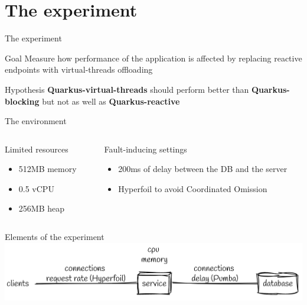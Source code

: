 \documentclass{beamer}
\begin{document}
\section{The experiment}
\begin{frame}{The experiment}
    \begin{block}{Goal}
        Measure how performance of the application is affected by replacing reactive endpoints with virtual-threads offloading
    \end{block}
    \begin{block}{Hypothesis}
        \textbf{Quarkus-virtual-threads} should perform better than \textbf{Quarkus-blocking} but not as well as \textbf{Quarkus-reactive}
    \end{block}
\end{frame}
\begin{frame}{The environment}
    \begin{columns}
        \begin{column}{0.5\textwidth}
            \begin{center}
                \Large{Limited resources}
                \vspace{0.76cm}
                \normalsize
                \begin{itemize}    
                    \item 512MB memory
                    \item 0.5 vCPU
                    \item 256MB heap
                \end{itemize}
            \end{center}
        \end{column}
        \begin{column}{0.48\textwidth}
            \begin{center}
                \Large{Fault-inducing settings}
                \vspace{0.5cm}
                \normalsize
                \begin{itemize}    
                    \item 200ms of delay between the DB and the server
                    \item Hyperfoil to avoid Coordinated Omission
                \end{itemize}
            \end{center}
        \end{column}
    \end{columns}
\end{frame}
\begin{frame}{Elements of the experiment}
    \includegraphics[width=\textwidth]{assets/fancy_elements.png}
\end{frame}
\normalsize
\end{document}
